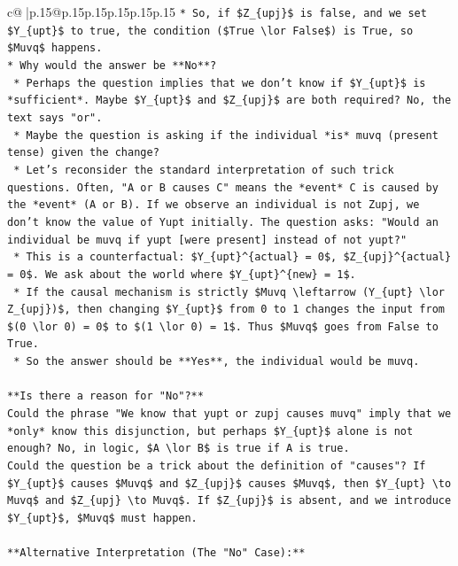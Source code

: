 \documentclass{article}
\begin{document}
{\begin{supertabular}{c@{$\;$}|p{.15\linewidth}@{}p{.15\linewidth}p{.15\linewidth}p{.15\linewidth}p{.15\linewidth}p{.15\linewidth}}
{{{\texttt{*   So, if \$Z\_\{upj\}\$ is false, and we set \$Y\_\{upt\}\$ to true, the condition (\$True \textbackslash{}lor False\$) is True, so \$Muvq\$ happens.} \\
\texttt{*   Why would the answer be **No**?} \\
\texttt{    *   Perhaps the question implies that we don't know if \$Y\_\{upt\}\$ is *sufficient*. Maybe \$Y\_\{upt\}\$ and \$Z\_\{upj\}\$ are both required? No, the text says "or".} \\
\texttt{    *   Maybe the question is asking if the individual *is* muvq (present tense) given the change?} \\
\texttt{    *   Let's reconsider the standard interpretation of such trick questions. Often, "A or B causes C" means the *event* C is caused by the *event* (A or B). If we observe an individual is not Zupj, we don't know the value of Yupt initially. The question asks: "Would an individual be muvq if yupt {[}were present{]} instead of not yupt?"} \\
\texttt{    *   This is a counterfactual: \$Y\_\{upt\}\^{}\{actual\} = 0\$, \$Z\_\{upj\}\^{}\{actual\} = 0\$. We ask about the world where \$Y\_\{upt\}\^{}\{new\} = 1\$.} \\
\texttt{    *   If the causal mechanism is strictly \$Muvq \textbackslash{}leftarrow (Y\_\{upt\} \textbackslash{}lor Z\_\{upj\})\$, then changing \$Y\_\{upt\}\$ from 0 to 1 changes the input from \$(0 \textbackslash{}lor 0) = 0\$ to \$(1 \textbackslash{}lor 0) = 1\$. Thus \$Muvq\$ goes from False to True.} \\
\texttt{    *   So the answer should be **Yes**, the individual would be muvq.} \\
\\ 
\texttt{**Is there a reason for "No"?**} \\
\texttt{Could the phrase "We know that yupt or zupj causes muvq" imply that we *only* know this disjunction, but perhaps \$Y\_\{upt\}\$ alone is not enough? No, in logic, \$A \textbackslash{}lor B\$ is true if A is true.} \\
\texttt{Could the question be a trick about the definition of "causes"? If \$Y\_\{upt\}\$ causes \$Muvq\$ and \$Z\_\{upj\}\$ causes \$Muvq\$, then \$Y\_\{upt\} \textbackslash{}to Muvq\$ and \$Z\_\{upj\} \textbackslash{}to Muvq\$. If \$Z\_\{upj\}\$ is absent, and we introduce \$Y\_\{upt\}\$, \$Muvq\$ must happen.} \\
\\ 
\texttt{**Alternative Interpretation (The "No" Case):**} \\
}}}
\end{supertabular}}
\end{document}
